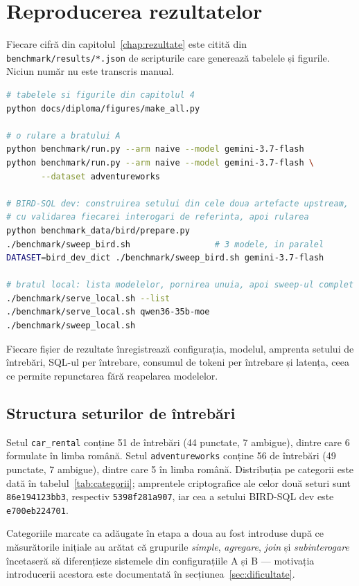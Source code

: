 \documentclass[12pt,a4paper]{report}
\newcommand{\code}[1]{\texttt{\small #1}}
\begin{document}
\chapter{Reproducerea rezultatelor}
\label{anx:reproducere}

Fiecare cifră din capitolul~\ref{chap:rezultate} este citită din \code{benchmark/results/*.json}
de scripturile care generează tabelele și figurile. Niciun număr nu este
transcris manual.

\begin{lstlisting}[language=bash,caption={Comenzile care regenerează
măsurătorile și materialul grafic al lucrării.},captionpos=b]
# tabelele si figurile din capitolul 4
python docs/diploma/figures/make_all.py

# o rulare a bratului A
python benchmark/run.py --arm naive --model gemini-3.7-flash
python benchmark/run.py --arm naive --model gemini-3.7-flash \
       --dataset adventureworks

# BIRD-SQL dev: construirea setului din cele doua artefacte upstream,
# cu validarea fiecarei interogari de referinta, apoi rularea
python benchmark_data/bird/prepare.py
./benchmark/sweep_bird.sh                 # 3 modele, in paralel
DATASET=bird_dev_dict ./benchmark/sweep_bird.sh gemini-3.7-flash

# bratul local: lista modelelor, pornirea unuia, apoi sweep-ul complet
./benchmark/serve_local.sh --list
./benchmark/serve_local.sh qwen36-35b-moe
./benchmark/sweep_local.sh
\end{lstlisting}

Fiecare fișier de rezultate înregistrează configurația, modelul, amprenta setului
de întrebări, SQL-ul per întrebare, consumul de tokeni per întrebare și
latența, ceea ce permite repunctarea fără reapelarea modelelor.

\section*{Structura seturilor de întrebări}

Setul \code{car\_rental} conține 51 de întrebări (44 punctate, 7 ambigue), dintre
care 6 formulate în limba română. Setul \code{adventureworks} conține 56 de
întrebări (49 punctate, 7 ambigue), dintre care 5 în limba română. Distribuția
pe categorii este dată în tabelul~\ref{tab:categorii}; amprentele criptografice
ale celor două seturi sunt \code{86e194123bb3}, respectiv \code{5398f281a907},
iar cea a setului BIRD-SQL dev este \code{e700eb224701}.

Categoriile marcate ca adăugate în etapa a doua au fost introduse după ce
măsurătorile inițiale au arătat că grupurile \emph{simple}, \emph{agregare},
\emph{join} și \emph{subinterogare} încetaseră să diferențieze sistemele din
configurațiile A și B --- motivația introducerii acestora este documentată în
secțiunea~\ref{sec:dificultate}.
\end{document}
